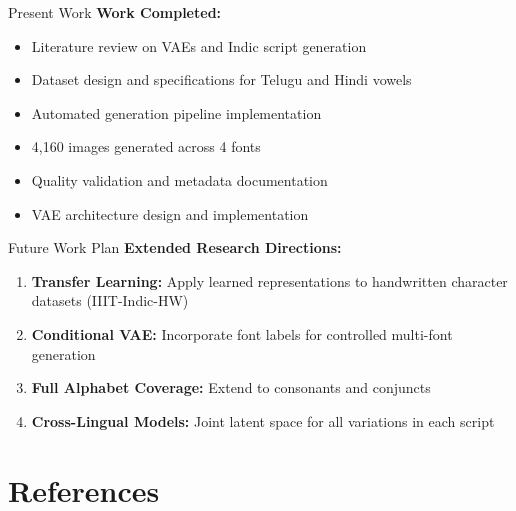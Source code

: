\documentclass[aspectratio=169, 12pt]{beamer}
\begin{document}
\begin{frame}{Present Work}
    \textbf{Work Completed:}
    \begin{itemize}
        \setlength\itemsep{0.8em}
        \item Literature review on VAEs and Indic script generation
        \item Dataset design and specifications for Telugu and Hindi vowels
        \item Automated generation pipeline implementation
        \item 4,160 images generated across 4 fonts
        \item Quality validation and metadata documentation
        \item VAE architecture design and implementation
    \end{itemize}
\end{frame}

\begin{frame}{Future Work Plan}
    \textbf{Extended Research Directions:}
    \begin{enumerate}
        \setlength\itemsep{0.8em}
        \item \textbf{Transfer Learning:} Apply learned representations to handwritten character datasets (IIIT-Indic-HW)
        
        \item \textbf{Conditional VAE:} Incorporate font labels for controlled multi-font generation
        
        \item \textbf{Full Alphabet Coverage:} Extend to consonants and conjuncts
        
        \item \textbf{Cross-Lingual Models:} Joint latent space for all variations in each script
    \end{enumerate}
\end{frame}

\section*{References}
\end{document}
